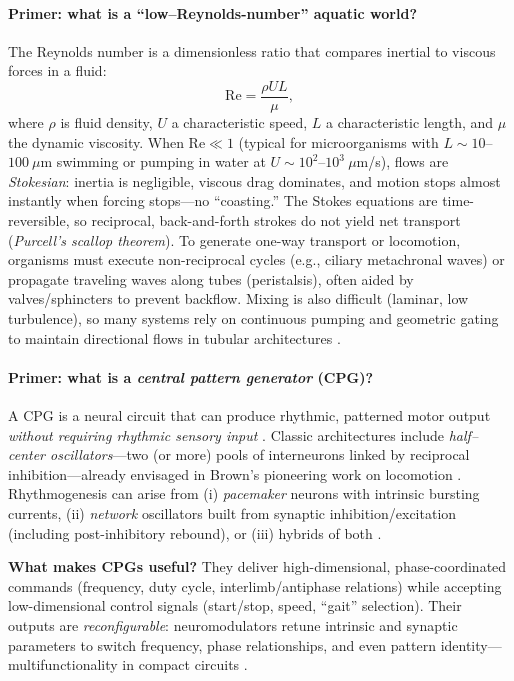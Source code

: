 
\paragraph{Primer: what is a ``low–Reynolds-number'' aquatic world?}\label{reynolds-number}
The Reynolds number is a dimensionless ratio that compares inertial to viscous forces in a fluid:
\[
\mathrm{Re}=\frac{\rho U L}{\mu},
\]
where $\rho$ is fluid density, $U$ a characteristic speed, $L$ a characteristic length, and $\mu$ the dynamic viscosity. 
When $\mathrm{Re}\ll 1$ (typical for microorganisms with $L\sim 10$–$100~\mu$m swimming or pumping in water at $U\sim 10^2$–$10^3~\mu$m/s), flows are \emph{Stokesian}: inertia is negligible, viscous drag dominates, and motion stops almost instantly when forcing stops—no ``coasting.'' 
The Stokes equations are time-reversible, so reciprocal, back-and-forth strokes do not yield net transport (\emph{Purcell’s scallop theorem}). 
To generate one-way transport or locomotion, organisms must execute non-reciprocal cycles (e.g., ciliary metachronal waves) or propagate traveling waves along tubes (peristalsis), often aided by valves/sphincters to prevent backflow. 
Mixing is also difficult (laminar, low turbulence), so many systems rely on continuous pumping and geometric gating to maintain directional flows in tubular architectures \citep{Purcell1977LowRe, BrennenWinet1977CiliaFlagella, LaugaPowers2009MicroSwimmers, Guasto2012Planktonic, Vogel1994LifeMovingFluids, Shapiro1969Peristalsis}.


\paragraph{Primer: what is a \emph{central pattern generator} (CPG)?}\label{CPG}
A CPG is a neural circuit that can produce rhythmic, patterned motor output \emph{without requiring rhythmic sensory input} \citep{MarderCalabrese1996PR,MarderBucher2001CB}. Classic architectures include \emph{half–center oscillators}—two (or more) pools of interneurons linked by reciprocal inhibition—already envisaged in Brown’s pioneering work on locomotion \citep{Brown1911IntrinsicProgression}. Rhythmogenesis can arise from (i) \textit{pacemaker} neurons with intrinsic bursting currents, (ii) \textit{network} oscillators built from synaptic inhibition/excitation (including post-inhibitory rebound), or (iii) hybrids of both \citep{Grillner2006Neuron,Kiehn2016NRN}. 

\textbf{What makes CPGs useful?} They deliver high-dimensional, phase-coordinated commands (frequency, duty cycle, interlimb/antiphase relations) while accepting low-dimensional control signals (start/stop, speed, “gait” selection). Their outputs are \emph{reconfigurable}: neuromodulators retune intrinsic and synaptic parameters to switch frequency, phase relationships, and even pattern identity—multifunctionality in compact circuits \citep{NusbaumBeenhakker2002Nature,Marder2012Neuromod}. 

